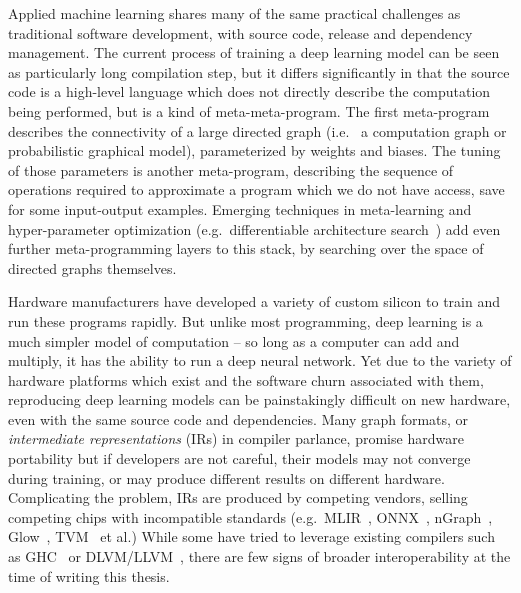 \documentclass[12pt,initial,twoside,maitrise]{dms}
\numberwithin{equation}{section}
\numberwithin{table}{chapter}
\numberwithin{figure}{chapter}
\begin{document}
Applied machine learning shares many of the same practical challenges as traditional software development, with source code, release and dependency management. The current process of training a deep learning model can be seen as particularly long compilation step, but it differs significantly in that the source code is a high-level language which does not directly describe the computation being performed, but is a kind of meta-meta-program. The first meta-program describes the connectivity of a large directed graph (i.e.~ a computation graph or probabilistic graphical model), parameterized by weights and biases. The tuning of those parameters is another meta-program, describing the sequence of operations required to approximate a program which we do not have access, save for some input-output examples. Emerging techniques in meta-learning and hyper-parameter optimization (e.g.~differentiable architecture search~\citep{liu2018darts}) add even further meta-programming layers to this stack, by searching over the space of directed graphs themselves.

Hardware manufacturers have developed a variety of custom silicon to train and run these programs rapidly. But unlike most programming, deep learning is a much simpler model of computation -- so long as a computer can add and multiply, it has the ability to run a deep neural network. Yet due to the variety of hardware platforms which exist and the software churn associated with them, reproducing deep learning models can be painstakingly difficult on new hardware, even with the same source code and dependencies. Many graph formats, or \textit{intermediate representations} (IRs) in compiler parlance, promise hardware portability but if developers are not careful, their models may not converge during training, or may produce different results on different hardware. Complicating the problem, IRs are produced by competing vendors, selling competing chips with incompatible standards (e.g.~MLIR~\citep{mlir}, ONNX~\citep{bai2019}, nGraph~\citep{cyphers2018intel}, Glow~\citep{rotem2018glow}, TVM~\citep{tvm2018} et al.) While some have tried to leverage existing compilers such as GHC~\citep{elliott2018simple} or DLVM/LLVM~\citep{wei2017dlvm}, there are few signs of broader interoperability at the time of writing this thesis.
\end{document}
